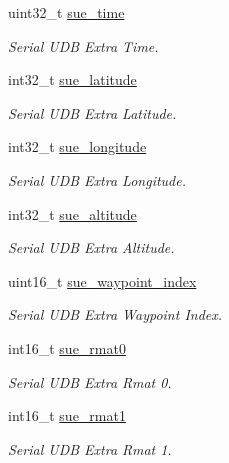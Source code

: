 \begin{DoxyCompactItemize}
\item 
uint32\+\_\+t \hyperlink{struct____mavlink__serial__udb__extra__f2__a__t_a7cafc2f94f075027d3f7cc3356369cd3}{sue\+\_\+time}
\begin{DoxyCompactList}\small\item\em Serial U\+D\+B Extra Time. \end{DoxyCompactList}\item 
int32\+\_\+t \hyperlink{struct____mavlink__serial__udb__extra__f2__a__t_aa65cb0a2ce7b3b0865b0f599a4803c03}{sue\+\_\+latitude}
\begin{DoxyCompactList}\small\item\em Serial U\+D\+B Extra Latitude. \end{DoxyCompactList}\item 
int32\+\_\+t \hyperlink{struct____mavlink__serial__udb__extra__f2__a__t_a0a1e1d5f67850634a927b14c95d8ffaa}{sue\+\_\+longitude}
\begin{DoxyCompactList}\small\item\em Serial U\+D\+B Extra Longitude. \end{DoxyCompactList}\item 
int32\+\_\+t \hyperlink{struct____mavlink__serial__udb__extra__f2__a__t_a507cccc9eba51810a3c82907c9f14909}{sue\+\_\+altitude}
\begin{DoxyCompactList}\small\item\em Serial U\+D\+B Extra Altitude. \end{DoxyCompactList}\item 
uint16\+\_\+t \hyperlink{struct____mavlink__serial__udb__extra__f2__a__t_a799b9135acca637bc0bd8833071399d1}{sue\+\_\+waypoint\+\_\+index}
\begin{DoxyCompactList}\small\item\em Serial U\+D\+B Extra Waypoint Index. \end{DoxyCompactList}\item 
int16\+\_\+t \hyperlink{struct____mavlink__serial__udb__extra__f2__a__t_ad3e75958b7807c6b437a84cae5a07911}{sue\+\_\+rmat0}
\begin{DoxyCompactList}\small\item\em Serial U\+D\+B Extra Rmat 0. \end{DoxyCompactList}\item 
int16\+\_\+t \hyperlink{struct____mavlink__serial__udb__extra__f2__a__t_a88796c2f6764caa58776ae594d2ce43e}{sue\+\_\+rmat1}
\begin{DoxyCompactList}\small\item\em Serial U\+D\+B Extra Rmat 1. \end{DoxyCompactList}\item 

\end{DoxyCompactItemize}
